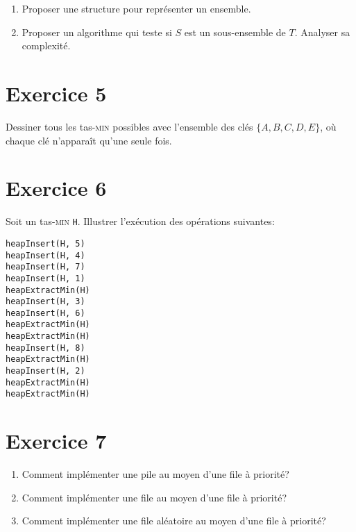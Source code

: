 \documentclass[a4paper,10pt]{article}
\begin{document}
\begin{enumerate}
\item Proposer une structure pour représenter un ensemble.
\item Proposer un algorithme qui teste si $S$ est un sous-ensemble de $T$. Analyser sa complexité.
\end{enumerate}


\section*{Exercice 5}

Dessiner tous les tas-\textsc{min} possibles avec l'ensemble des clés $\{A, B, C, D, E\}$, où chaque clé n'apparaît qu'une seule fois.

\section*{Exercice 6}

Soit un tas-\textsc{min} \texttt{H}. Illustrer l'exécution des opérations suivantes:

\begin{verbatim}
heapInsert(H, 5)
heapInsert(H, 4)
heapInsert(H, 7)
heapInsert(H, 1)
heapExtractMin(H)
heapInsert(H, 3)
heapInsert(H, 6)
heapExtractMin(H)
heapExtractMin(H)
heapInsert(H, 8)
heapExtractMin(H)
heapInsert(H, 2)
heapExtractMin(H)
heapExtractMin(H)
\end{verbatim}

\section*{Exercice 7}

\begin{enumerate}
\item Comment implémenter une pile au moyen d'une file à priorité?
\item Comment implémenter une file au moyen d'une file à priorité?
\item Comment implémenter une file aléatoire au moyen d'une file à priorité?
\end{enumerate}
\end{document}
